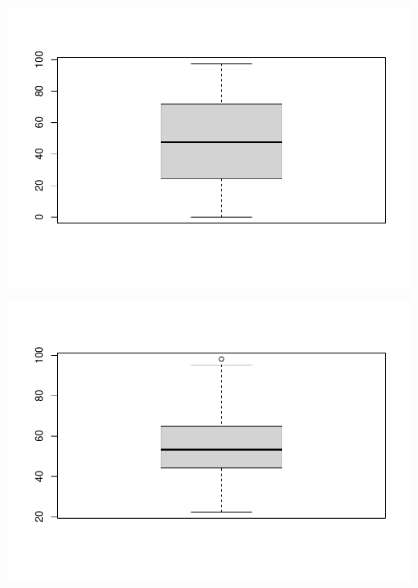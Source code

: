 \documentclass[
]{book}
\newenvironment{Shaded}{\begin{snugshade}}{\end{snugshade}}
\newcommand{\FunctionTok}[1]{\textcolor[rgb]{0.00,0.00,0.00}{#1}}
\newcommand{\NormalTok}[1]{#1}
\newcommand{\SpecialCharTok}[1]{\textcolor[rgb]{0.00,0.00,0.00}{#1}}
\begin{document}
\includegraphics{Esatadistica_en_R_files/figure-latex/unnamed-chunk-213-2.pdf}

\begin{Shaded}
\end{Shaded}

\includegraphics{Esatadistica_en_R_files/figure-latex/unnamed-chunk-213-3.pdf}

\begin{Shaded}
\end{Shaded}
\end{document}
